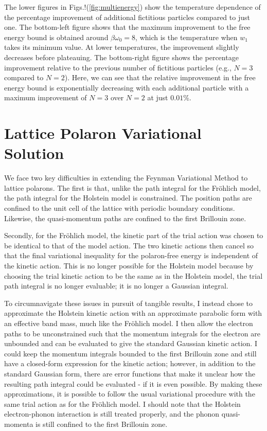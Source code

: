The lower figures in Figs.!(\ref{fig:multienergy}) show the temperature dependence of the percentage improvement of additional fictitious particles compared to just one. The bottom-left figure shows that the maximum improvement to the free energy bound is obtained around $\beta \omega_0 = 8$, which is the temperature when $w_1$ takes its minimum value. At lower temperatures, the improvement slightly decreases before plateauing. The bottom-right figure shows the percentage improvement relative to the previous number of fictitious particles (e.g., $N = 3$ compared to $N = 2$). Here, we can see that the relative improvement in the free energy bound is exponentially decreasing with each additional particle with a maximum improvement of $N=3$ over $N=2$ at just $0.01$\%.

\section{Lattice Polaron Variational Solution}

We face two key difficulties in extending the Feynman Variational Method to lattice polarons. The first is that, unlike the path integral for the Fr\"ohlich model, the path integral for the Holstein model is constrained. The position paths are confined to the unit cell of the lattice with periodic boundary conditions. Likewise, the quasi-momentum paths are confined to the first Brillouin zone. 

Secondly, for the Fr\"ohlich model, the kinetic part of the trial action was chosen to be identical to that of the model action. The two kinetic actions then cancel so that the final variational inequality for the polaron-free energy is independent of the kinetic action. This is no longer possible for the Holstein model because by choosing the trial kinetic action to be the same as in the Holstein model, the trial path integral is no longer evaluable; it is no longer a Gaussian integral.

To circumnavigate these issues in pursuit of tangible results, I instead chose to approximate the Holstein kinetic action with an approximate parabolic form with an effective band mass, much like the Fr\"ohlich model. I then allow the electron paths to be unconstrained such that the momentum integrals for the electron are unbounded and can be evaluated to give the standard Gaussian kinetic action. I could keep the momentum integrals bounded to the first Brillouin zone and still have a closed-form expression for the kinetic action; however, in addition to the standard Gaussian form, there are error functions that make it unclear how the resulting path integral could be evaluated - if it is even possible. By making these approximations, it is possible to follow the usual variational procedure with the same trial action as for the Fr\"ohlich model. I should note that the Holstein electron-phonon interaction is still treated properly, and the phonon quasi-momenta is still confined to the first Brillouin zone. 

